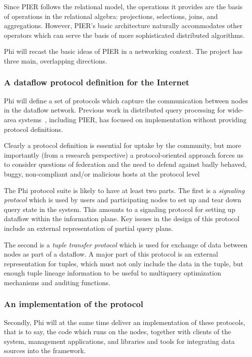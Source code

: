 \documentclass[twocolumn,10pt]{article}
\def\Lrp{Phi\xspace}
\begin{document}
Since PIER follows the relational model, the operations it provides
are the basis of operations in the relational algebra: projections,
selections, joins, and aggregations.  However, PIER's basic
architecture naturally accommodates other operators which can serve the
basis of more sophisticated distributed algorithms. 

\Lrp will recast the basic ideas of PIER in a networking context.  The
project has three main, overlapping directions. 

\subsubsection*{A dataflow protocol definition for the Internet}

\Lrp will define a set of protocols which capture the
communication between nodes in the dataflow network.  Previous work in
distributed query processing for wide-area
systems~\cite{astrolabe,Gibbons2003,Yalagandula2004}, including PIER, has 
focused on implementation without providing protocol definitions.

Clearly a protocol definition is essential for uptake by the
community, but more importantly (from a research perspective) a
protocol-oriented approach forces us to consider questions of
federation and the need to defend against badly behaved, buggy,
non-compliant and/or malicious hosts at the protocol level

The \Lrp protocol suite is likely to have at least two parts.  The first
is a \emph{signaling protocol} which is used by users and
participating nodes to set up and tear down query state in the system.
This amounts to a signaling protocol for setting up dataflow within
the information plane.  Key issues in the design of this protocol
include an external  representation of partial query plans.

The second is a \emph{tuple transfer protocol} which is used for
exchange of data between nodes as part of a dataflow.  A major part of
this protocol is an external representation for tuples, which must not
only include the data in the tuple, but enough tuple lineage
information to be useful to multiquery optimization mechanisms and
auditing functions. 

\subsubsection*{An implementation of the protocol}

Secondly, \Lrp will at the same time deliver an implementation
of these protocols, that is to say, the code which runs on the nodes,
together with clients of the system, management applications, and
libraries and tools for integrating data sources into the framework. 
\end{document}

